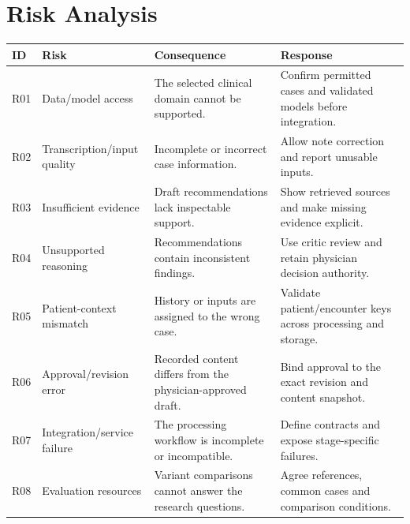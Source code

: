 \section{ Risk Analysis}

\begin{reporttable}
\centering
\small
\caption{Project risks, consequences and intended responses.}
\label{tab:kashaf:risks}
\begin{tabular}{|p{}|p{}|p{}|p{}|}
\hline
ID & Risk & Consequence & Response \\ \hline
R01 & Data/model access & The selected clinical domain cannot be supported. & Confirm permitted cases and validated models before integration. \\ \hline
R02 & Transcription/input quality & Incomplete or incorrect case information. & Allow note correction and report unusable inputs. \\ \hline
R03 & Insufficient evidence & Draft recommendations lack inspectable support. & Show retrieved sources and make missing evidence explicit. \\ \hline
R04 & Unsupported reasoning & Recommendations contain inconsistent findings. & Use critic review and retain physician decision authority. \\ \hline
R05 & Patient-context mismatch & History or inputs are assigned to the wrong case. & Validate patient/encounter keys across processing and storage. \\ \hline
R06 & Approval/revision error & Recorded content differs from the physician-approved draft. & Bind approval to the exact revision and content snapshot. \\ \hline
R07 & Integration/service failure & The processing workflow is incomplete or incompatible. & Define contracts and expose stage-specific failures. \\ \hline
R08 & Evaluation resources & Variant comparisons cannot answer the research questions. & Agree references, common cases and comparison conditions. \\ \hline
\end{tabular}
\end{reporttable}


